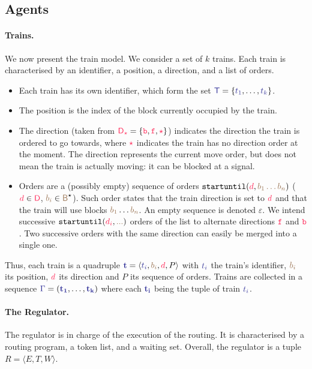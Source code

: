 \documentclass[runningheads]{llncs}
\newcommand{\tuple}[1]{\ensuremath{\langle #1\rangle}}
\newcommand{\directions}{\dirFmt{\mathsf{D}}}
\newcommand{\forward}{\ensuremath{\mathtt{f}}}
\newcommand{\backward}{\ensuremath{\mathtt{b}}\xspace}
\newcommand{\dirFmt}[1]{{\color{dircolor} #1}}
\newcommand{\dirForward}{\ensuremath{\dirFmt{\forward}}\xspace}
\newcommand{\dirBackward}{\ensuremath{\dirFmt{\backward}}\xspace}
\newcommand{\dirStop}{\ensuremath{\dirFmt{\star}}\xspace}
\newcommand{\posFmt}[1]{{\color{poscolor}{#1}}}
\newcommand{\blocks}{{\posFmt{\mathsf{B}}}}
\newcommand{\bid}[1]{\ensuremath{\posFmt{b_{#1}}}}
\newcommand{\trainFmt}[1]{{\color{traincolor} #1}}
\newcommand{\trainTuple}[4]{\langle \trainFmt{#1}, \posFmt{#2}, \dirFmt{#3}, #4 \rangle}
\newcommand{\trainSeq}{\ensuremath{\trainFmt{\Gamma}}\xspace}
\newcommand{\trains}{{\trainFmt{\mathsf{T}}}}
\newcommand{\tid}[1]{\ensuremath{\trainFmt{t_{#1}}}}
\newcommand{\su}[2]{{\mbox{$\mathtt{startuntil}(\dirFmt{#1}, \posFmt{#2})$}}\xspace}
\newcommand{\emptyTrainProg}{\varepsilon}
\newcommand{\regTuple}[3]{\tuple{#1, #2, #3}}
\newcommand{\tokens}{\ensuremath{T}}
\begin{document}
\subsection{Agents}
\paragraph{Trains.}
We now present the train model. We consider a set of $k$ trains. 
Each train is characterised by an identifier, a position, a direction, and a list of orders. 
\begin{itemize}
	\item Each train has its own identifier, which form the set $\trains = \{\tid{1}, \ldots, \tid{k}\}$.
	\item The position is the index of the block currently occupied by the train.
	\item The direction (taken from $\directions_\dirStop = \{\dirBackward, \dirForward, \dirStop\}$) indicates the direction the train is ordered to go towards, where \dirStop indicates the train has no direction order at the moment. The direction represents the current move order, but does not mean the train is actually moving: it can be blocked at a signal.
	\item Orders are a (possibly empty) sequence of orders $\su{d}{\bid{1}\dots\bid{n}}$ ($\dirFmt{d} \in \directions$, $\bid{i} \in \blocks^\star$). Such order states that the train direction is set to $\dirFmt{d}$ and that the train will use blocks $\bid{1}\dots\bid{n}$. An empty sequence is denoted $\emptyTrainProg$. We intend successive \su{d_i}{...} orders of the list to alternate directions \dirForward{} and \dirBackward{}. Two successive orders with the same direction can easily be merged into a single one.
\end{itemize}

Thus, each train is a quadruple $\trainFmt{{\bf t}} = \trainTuple{\tid{i}}{\bid{i}}{d}{P}$ with $\tid{i}$ the train's identifier, $\bid{i}$ its position, $\dirFmt{d}$ its direction and $P$ its sequence of orders. Trains are collected in a sequence $\trainSeq = (\trainFmt{{\bf t_1}}, \ldots, \trainFmt{{\bf t_k}})$ where each $\trainFmt{{\bf t_i}}$ being the tuple of train $\trainFmt{\tid{i}}$. 


\paragraph{The Regulator.}
The regulator is in charge of the execution of the routing. It is characterised by a routing program, a token list, and a waiting set. Overall, the regulator is a tuple $R = \regTuple{E}{\tokens}{W}$. 
\end{document}
